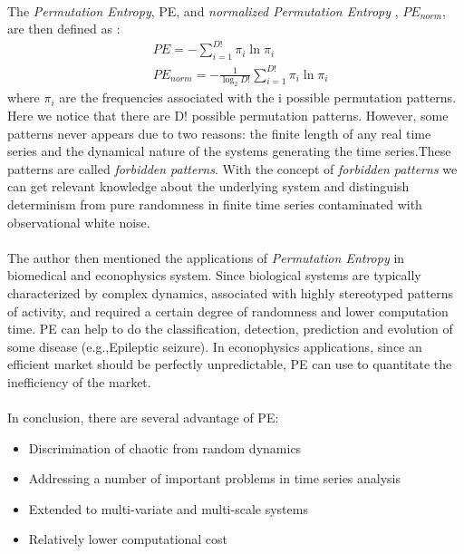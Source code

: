\documentclass{article}
\begin{document}
\paragraph{}
The {\it Permutation Entropy}, PE, and {\it normalized Permutation Entropy }, $PE_{norm}$, are then defined as :
\begin{align*} 
&PE=-\sum_{i=1}^{D!}\pi_i 
 \ln \pi_i \\ &PE_{norm}=-\frac{1}{\log _2 D!}\sum_{i=1}^{D!}\pi_i \ln \pi_i
\end{align*} 
where $\pi_i$ are the frequencies associated with the i possible permutation patterns. Here we notice that there are D! possible permutation patterns. However, some patterns never appears due to two reasons: the finite length of any real time series and the dynamical nature of the systems generating the time series.These patterns are called {\it forbidden patterns}. With the concept of {\it forbidden patterns} we can get relevant knowledge about the underlying system and distinguish determinism from pure randomness in finite time series contaminated with observational white noise.  


\paragraph{}
\paragraph{}
The author then mentioned the applications of {\it Permutation Entropy} in biomedical and econophysics system. Since biological systems are typically characterized by complex dynamics, associated with highly stereotyped patterns of activity, and required a certain degree of randomness and lower computation time. PE can help to do the classification, detection, prediction and evolution of some disease (e.g.,Epileptic seizure). In econophysics applications, since an efficient market should be perfectly unpredictable, PE can use to quantitate the inefficiency of the market.
\paragraph{}
In conclusion, there are several advantage of PE: 
\begin{itemize}
\item Discrimination of chaotic from random dynamics
\item Addressing a number of important problems in time series analysis
\item Extended to multi-variate and multi-scale systems
\item Relatively lower computational cost
\end{itemize}
\end{document}
